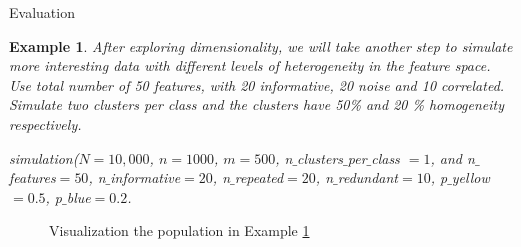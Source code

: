 \documentclass[12pt]{pom_thesis}
\newtheorem{example}{Example}[section]
\begin{document}
\begin{chapter}{Evaluation}

\newpage

\begin{example}
\label{example5}
After exploring dimensionality, we will take another step to simulate more interesting data with different levels of heterogeneity in the feature space. Use total number of 50 features, with 20 informative, 20 noise and 10 correlated. Simulate two clusters per class and the clusters have 50\% and 20 \% homogeneity respectively.

simulation($N=10,000$, $n=1000$, $m=500$, n$\_$clusters$\_$per$\_$class $= 1$, and n$\_$features$=50$, n$\_$informative$=20$, n$\_$repeated$=20$, n$\_$redundant$=10$, p$\_$yellow$=0.5$, p$\_$blue$=0.2$.
\end{example}


\begin{figure}[h]
\centering
\label{fig5}
\caption{Visualization the population in Example \ref{example5}}
\end{figure}



\end{chapter}
\end{document}
